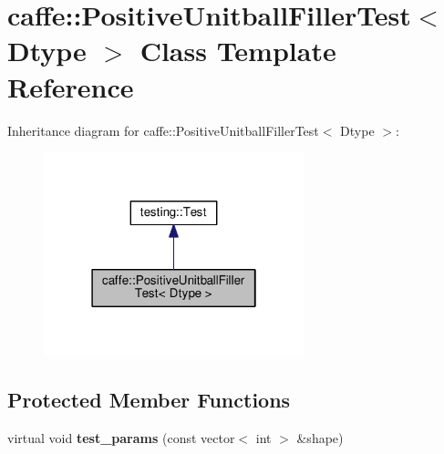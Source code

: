 \hypertarget{classcaffe_1_1_positive_unitball_filler_test}{}\section{caffe\+:\+:Positive\+Unitball\+Filler\+Test$<$ Dtype $>$ Class Template Reference}
\label{classcaffe_1_1_positive_unitball_filler_test}


Inheritance diagram for caffe\+:\+:Positive\+Unitball\+Filler\+Test$<$ Dtype $>$\+:
\nopagebreak
\begin{figure}[H]
\begin{center}
\leavevmode
\includegraphics[width=214pt]{classcaffe_1_1_positive_unitball_filler_test__inherit__graph}
\end{center}
\end{figure}
\subsection*{Protected Member Functions}
\begin{DoxyCompactItemize}
\item 
\mbox{\label{classcaffe_1_1_positive_unitball_filler_test_afb00d602c08042c79983010994dbf404}} 
virtual void {\bfseries test\+\_\+params} (const vector$<$ int $>$ \&shape)
\end{DoxyCompactItemize}
